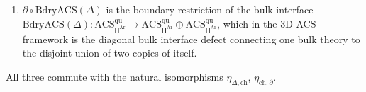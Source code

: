 \begin{proposition}
\begin{enumerate}
of Platonic bars, compatible with the bar differential because
\(\Delta\) preserves the spherical units and is a homomorphism of
chiral algebras.
\item \(\partial\circ\mathrm{BdryACS}(\Delta)\) is the boundary
restriction of the bulk interface
\(\mathrm{BdryACS}(\Delta)\colon\mathrm{ACS}^{\mathrm{qu}}_{\mathsf{H}^{\mathrm{Ar}}}\to\mathrm{ACS}^{\mathrm{qu}}_{\mathsf{H}^{\mathrm{Ar}}}\oplus\mathrm{ACS}^{\mathrm{qu}}_{\mathsf{H}^{\mathrm{Ar}}}\),
which in the 3D ACS framework is the diagonal bulk interface defect connecting one bulk theory to the
disjoint union of two copies of itself.
\end{enumerate}
All three commute with the natural isomorphisms
\(\eta_{\Delta,\mathrm{ch}}\), \(\eta_{\mathrm{ch},\partial}\).
\end{proposition}


